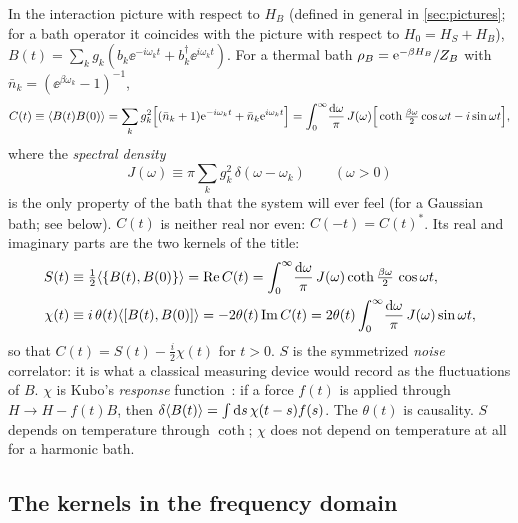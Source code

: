 In the interaction picture with respect to $H_B$ (defined in general in \cref{sec:pictures}; for a bath operator it coincides with the picture with respect to $H_0=H_S+H_B$), $B(t)=\sum_kg_k(b_k\ee^{-i\omega_kt}+b_k^\dagger\ee^{i\omega_kt})$.
For a thermal bath $\rho_{B}=\mathrm{e}^{-\beta H_B}/Z_B$ with $\bar n_k=(\ee^{\beta\omega_k}-1)^{-1}$,
\begin{equation}
  C(t)\equiv\langle B(t)B(0)\rangle=\sum_kg_k^2\Big[(\bar n_k+1)\mathrm{e}^{-i\omega_kt}+\bar n_k\mathrm{e}^{i\omega_kt}\Big]
  =\int_0^\infty\!\frac{\mathrm{d}\omega}{\pi}\,J(\omega)\Big[\coth\tfrac{\beta\omega}{2}\cos\omega t-i\sin\omega t\Big],
  \label{eq:C}
\end{equation}
where the \emph{spectral density}
\begin{equation}
  J(\omega)\equiv\pi\sum_kg_k^2\,\delta(\omega-\omega_k)\qquad(\omega>0)
  \label{eq:J}
\end{equation}
is the only property of the bath that the system will ever feel (for a Gaussian bath; see below).
$C(t)$ is neither real nor even: $C(-t)=C(t)^*$.
Its real and imaginary parts are the two kernels of the title:
\begin{align}
  S(t)&\equiv\tfrac12\langle\{B(t),B(0)\}\rangle=\operatorname{Re} C(t)=\int_0^\infty\!\frac{\mathrm{d}\omega}{\pi}\,J(\omega)\coth\tfrac{\beta\omega}2\,\cos\omega t ,
  \label{eq:S-def}\\
  \chi(t)&\equiv i\,\theta(t)\langle[B(t),B(0)]\rangle=-2\theta(t)\operatorname{Im} C(t)=2\theta(t)\int_0^\infty\!\frac{\mathrm{d}\omega}{\pi}\,J(\omega)\sin\omega t ,
  \label{eq:chi-def}
\end{align}
so that $C(t)=S(t)-\tfrac{i}{2}\chi(t)$ for $t>0$.
$S$ is the symmetrized \emph{noise} correlator: it is what a classical measuring device would record as the fluctuations of $B$.
$\chi$ is Kubo's \emph{response} function~\cite{Kubo1957}: if a force $f(t)$ is applied through $H\to H-f(t)B$, then $\delta\langle B(t)\rangle=\int\mathrm{d} s\,\chi(t-s)f(s)$.
The $\theta(t)$ is causality.
$S$ depends on temperature through $\coth$; $\chi$ does not depend on temperature at all for a harmonic bath.

\subsection{The kernels in the frequency domain}
\label{sec:freq-domain}

